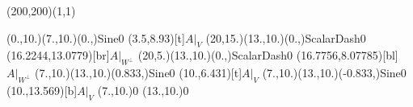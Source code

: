 \unitlength=1bp%

\begin{feynartspicture}(200,200)(1,1)

\FADiagram{}
\FAProp(0.,10.)(7.,10.)(0.,){Sine}{0}
\FALabel(3.5,8.93)[t]{$A|_V$}
\FAProp(20,15.)(13.,10.)(0.,){ScalarDash}{0}
\FALabel(16.2244,13.0779)[br]{$A|_{W^\perp}$}
\FAProp(20,5.)(13.,10.)(0.,){ScalarDash}{0}
\FALabel(16.7756,8.07785)[bl]{$A|_{W^\perp}$}
\FAProp(7.,10.)(13.,10.)(0.833,){Sine}{0}
\FALabel(10.,6.431)[t]{$A|_V$}
\FAProp(7.,10.)(13.,10.)(-0.833,){Sine}{0}
\FALabel(10.,13.569)[b]{$A|_V$}
\FAVert(7.,10.){0}
\FAVert(13.,10.){0}
\end{feynartspicture}

